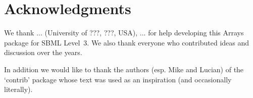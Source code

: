 
\section{Acknowledgments}

We thank ... (University of ???, ???, USA), ...
for help developing this Arrays package for SBML
Level~3.  We also thank everyone who contributed ideas and discussion over
the years.

In addition we would like to thank the authors (esp. Mike and Lucian) of the `contrib' package whose text was used as an inspiration (and occasionally literally).

